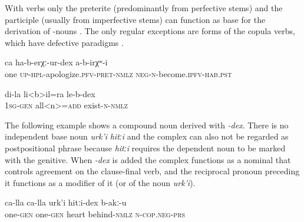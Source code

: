 With verbs only the preterite (predominantly from perfective stems) and the  participle (usually from imperfective stems) can function as base for the derivation of -nouns . The only regular exceptions are forms of the copula verbs, which have defective paradigms .
%
\begin{exe}
	\ex	\label{They did not forgive (each other)}
	\gll	ca	ha-b-erχː-ur-dex	a-b-irχʷ-i\\
		one	\textsc{up-hpl}-apologize.\textsc{pfv}-\textsc{pret}-\textsc{nmlz}	\textsc{neg}-\textsc{n}-become.\textsc{ipfv}-\textsc{hab}.\textsc{pst}\\
	\glt	{}

	\ex	\label{all my existing (things)}
	\gll	di-la	li<b>il=ra	le-b-dex\\
		1\textsc{sg}-\textsc{gen}	all<n>=\textsc{add}	exist-\textsc{n}-\textsc{nmlz}\\
	\glt	{}
\end{exe}

The following example shows a compound noun derived with \textit{-dex}. There is no independent base noun \textit{urk'i} \textit{hitːi} and the complex can also not be regarded as postpositional phrase because \textit{hitːi} requires the dependent noun to be marked with the genitive. When \textit{-dex} is added the complex functions as a nominal that controls agreement on the clause-final verb, and the reciprocal pronoun preceding it functions as a modifier of it (or of the noun \textit{urk'i}).
%
\begin{exe}
	\ex	\label{There is no pity between them}
	\gll	ca-lla	ca-lla	urk'i	hitːi-dex	b-akː-u\\
		one-\textsc{gen}	one-\textsc{gen}	heart	behind-\textsc{nmlz}	\textsc{n}-\textsc{cop.neg}-\textsc{prs} \\
	\glt	{}
\end{exe}

